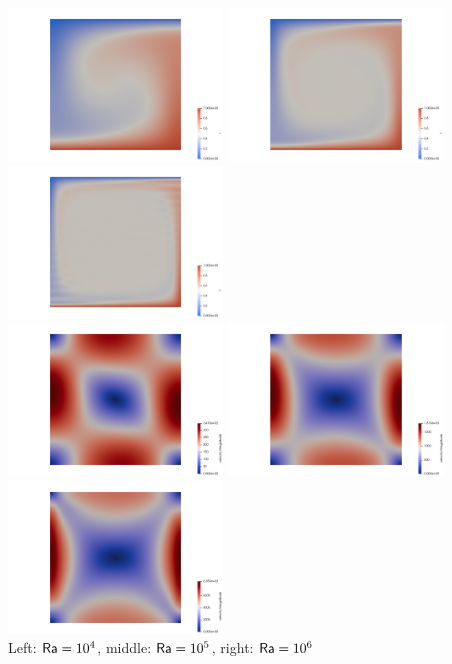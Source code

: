 \begin{center}
\includegraphics[width=5.7cm]{python_codes/fieldstone_110/results_BA/aspect/T_Ra1e4}
\includegraphics[width=5.7cm]{python_codes/fieldstone_110/results_BA/aspect/T_Ra1e5}
\includegraphics[width=5.7cm]{python_codes/fieldstone_110/results_BA/aspect/T_Ra1e6}\\
\includegraphics[width=5.7cm]{python_codes/fieldstone_110/results_BA/aspect/vel_Ra1e4}
\includegraphics[width=5.7cm]{python_codes/fieldstone_110/results_BA/aspect/vel_Ra1e5}
\includegraphics[width=5.7cm]{python_codes/fieldstone_110/results_BA/aspect/vel_Ra1e6}\\
{\captionfont Left: ${\mathsf{Ra}}=10^4$, middle: ${\mathsf{Ra}}=10^5$, right: ${\mathsf{Ra}}=10^6$} 
\end{center}

